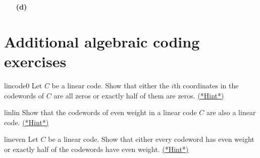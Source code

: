 \begin{exercise}{}
\begin{minipage}[t]{4.6in}
\begin{minipage}[t]{2.25in}
\begin{itemize}
\end{itemize}
\end{minipage} \hfill
\begin{minipage}[t]{2.25in}
\begin{itemize}
 
 \item[{\bf (d)}]
 
\end{itemize}
\end{minipage}
\end{minipage}
 
\end{exercise}
 

\section{Additional algebraic coding exercises}
\label{sec:ErrorAndCorrectionCode:AdditionalCodingExercises}
 

\begin{exercise}{lincode0}  
Let $C$ be a linear code. Show that either the $i$th coordinates in the
codewords of $C$ are all zeros or exactly half of them are zeros. \hyperref[sec:ErrorAndCorrectionCode:Hints]{(*Hint*)}
\end{exercise} 

\begin{exercise}{linlin}
Show that the codewords of even weight in a linear code $C$ are also a
linear code.  \hyperref[sec:ErrorAndCorrectionCode:Hints]{(*Hint*)}
\end{exercise}	 


\begin{exercise}{lineven}
Let $C$ be a linear code. Show that either every codeword has even
weight or exactly half of the codewords have even weight.  \hyperref[sec:ErrorAndCorrectionCode:Hints]{(*Hint*)}
\end{exercise} 
 
